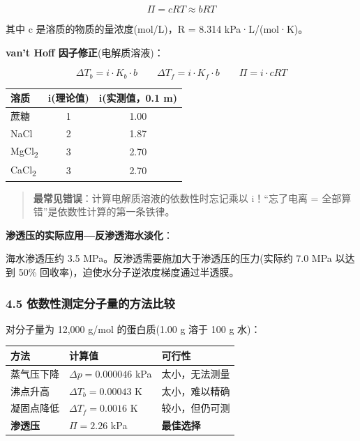 \documentclass[a4paper,11pt]{ctexart}
\newcounter{none}
\newcommand{\箭}{\ensuremath{\rightarrow}}
\newcommand{\左箭}{\ensuremath{\leftarrow}}
\newcommand{\上箭}{\ensuremath{\uparrow}}
\newcommand{\下箭}{\ensuremath{\downarrow}}
\newcommand{\衡}{\ensuremath{\rightleftharpoons}}
\newcommand{\双箭}{\ensuremath{\leftrightarrow}}
\newcommand{\约等于}{\ensuremath{\approx}}
\newcommand{\小于等于}{\ensuremath{\leq}}
\newcommand{\大于等于}{\ensuremath{\geq}}
\newcommand{\不等于}{\ensuremath{\neq}}
\newcommand{\西格马}{\ensuremath{\sigma}}
\newcommand{\派}{\ensuremath{\pi}}
\begin{document}
\[
\boxed{\Pi = cRT \approx bRT}
\]

其中 c 是溶质的物质的量浓度(mol/L)，R = 8.314 kPa·L/(mol·K)。

\textbf{van't Hoff 因子修正}(电解质溶液)：

\[
\Delta T_b = i \cdot K_b \cdot b \qquad \Delta T_f = i \cdot K_f \cdot b \qquad \Pi = i \cdot cRT
\]

{\def\LTcaptype{none} %
\begin{longtable}[]{@{}lcc@{}}
\toprule\noalign{}
溶质 & i(理论值) & i(实测值，0.1 m) \\
\midrule\noalign{}
\endhead
\bottomrule\noalign{}
\endlastfoot
蔗糖 & 1 & 1.00 \\
NaCl & 2 & 1.87 \\
MgCl\textsubscript{2} & 3 & 2.70 \\
CaCl\textsubscript{2} & 3 & 2.70 \\
\end{longtable}
}

\begin{quote}
\textbf{最常见错误}：计算电解质溶液的依数性时忘记乘以 i！``忘了电离 = 全部算错''是依数性计算的第一条铁律。
\end{quote}

\textbf{渗透压的实际应用---反渗透海水淡化}：

海水渗透压约 3.5 MPa。反渗透需要施加大于渗透压的压力(实际约 7.0 MPa 以达到 50\% 回收率)，迫使水分子逆浓度梯度通过半透膜。

\subsubsection{4.5 依数性测定分子量的方法比较}\label{ux4f9dux6570ux6027ux6d4bux5b9aux5206ux5b50ux91cfux7684ux65b9ux6cd5ux6bd4ux8f83}

对分子量为 12,000 g/mol 的蛋白质(1.00 g 溶于 100 g 水)：

{\def\LTcaptype{none} %
\begin{longtable}[]{@{}lll@{}}
\toprule\noalign{}
方法 & 计算值 & 可行性 \\
\midrule\noalign{}
\endhead
\bottomrule\noalign{}
\endlastfoot
蒸气压下降 & \(\Delta p = 0.000046\) kPa & 太小，无法测量 \\
沸点升高 & \(\Delta T_b = 0.00043\) K & 太小，难以精确 \\
凝固点降低 & \(\Delta T_f = 0.0016\) K & 较小，但仍可测 \\
\textbf{渗透压} & \(\Pi = 2.26\) kPa & \textbf{最佳选择} \\
\end{longtable}
}
\end{document}
